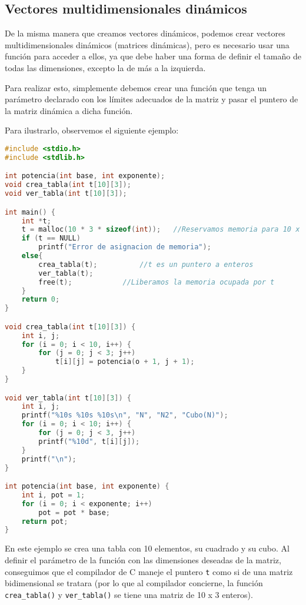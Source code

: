 \subsection{Vectores multidimensionales dinámicos}{
De la misma manera que creamos vectores dinámicos, podemos crear vectores multidimensionales dinámicos (matrices dinámicas), pero es necesario usar una función para acceder a ellos, ya que debe haber una forma de definir el tamaño de todas las dimensiones, excepto la de más a la izquierda.

Para realizar esto, simplemente debemos crear una función que tenga un parámetro declarado con los límites adecuados de la matriz y pasar el puntero de la matriz dinámica a dicha función.

Para ilustrarlo, observemos el siguiente ejemplo:
\begin{Ejemplo}
\begin{lstlisting}[language=C]
#include <stdio.h>
#include <stdlib.h>

int potencia(int base, int exponente);
void crea_tabla(int t[10][3]);
void ver_tabla(int t[10][3]);

int main() {
    int *t;
    t = malloc(10 * 3 * sizeof(int));	//Reservamos memoria para 10 x 3 enteros
    if (t == NULL)
        printf("Error de asignacion de memoria");
    else{
        crea_tabla(t);			//t es un puntero a enteros
        ver_tabla(t);
        free(t);			//Liberamos la memoria ocupada por t
    }
    return 0;
}

void crea_tabla(int t[10][3]) {
    int i, j;
    for (i = 0; i < 10, i++) {
        for (j = 0; j < 3; j++)
            t[i][j] = potencia(o + 1, j + 1);
    }
}

void ver_tabla(int t[10][3]) {
    int i, j;
    printf("%10s %10s %10s\n", "N", "N2", "Cubo(N)");
    for (i = 0; i < 10; i++) {
        for (j = 0; j < 3, j++)
        printf("%10d", t[i][j]);
    }
    printf("\n");
}

int potencia(int base, int exponente) {
    int i, pot = 1;
    for (i = 0; i < exponente; i++)
        pot = pot * base;
    return pot;
}
\end{lstlisting}
\Explicacion
En este ejemplo se crea una tabla con 10 elementos, su cuadrado y su cubo. Al definir el parámetro de la función con las dimensiones deseadas de la matriz, conseguimos que el compilador de C maneje el puntero \texttt{t} como  si de una matriz bidimensional se tratara (por lo que al compilador concierne, la función \texttt{crea\_tabla()} y \texttt{ver\_tabla()} se tiene una matriz de 10 x 3 enteros).
\end{Ejemplo}
}
